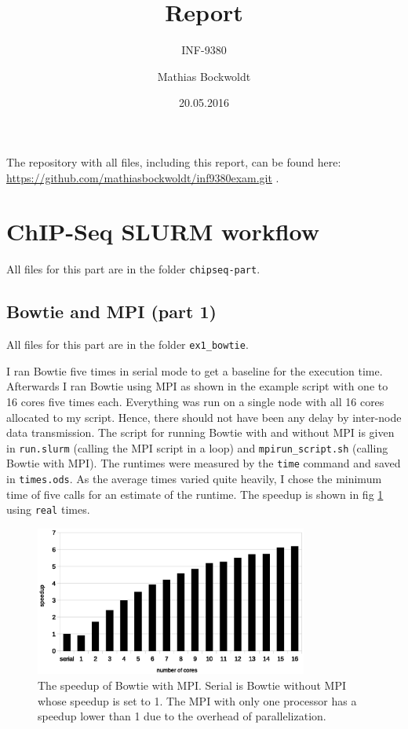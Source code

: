 \documentclass[paper=a4, 12pt]{scrartcl}
\begin{document}
\title{Report}
\subtitle{INF-9380}
\author{Mathias Bockwoldt}
\date{20.05.2016}

\maketitle

\onehalfspacing

The repository with all files, including this report, can be found here: \url{https://github.com/mathiasbockwoldt/inf9380exam.git} .

\section{ChIP-Seq SLURM workflow}

All files for this part are in the folder \texttt{chipseq-part}.

\subsection{Bowtie and MPI (part 1)}

All files for this part are in the folder \texttt{ex1\_bowtie}.

I ran Bowtie five times in serial mode to get a baseline for the execution time. Afterwards I ran Bowtie using MPI as shown in the example script with one to 16 cores five times each. Everything was run on a single node with all 16 cores allocated to my script. Hence, there should not have been any delay by inter-node data transmission. The script for running Bowtie with and without MPI is given in \texttt{run.slurm} (calling the MPI script in a loop) and \texttt{mpirun\_script.sh} (calling Bowtie with MPI). The runtimes were measured by the \texttt{time} command and saved in \texttt{times.ods}. As the average times varied quite heavily, I chose the minimum time of five calls for an estimate of the runtime. The speedup is shown in fig \ref{fig:chipseq-bowtie} using \texttt{real} times.

\begin{figure}[ht]
	\centering
		\includegraphics[width=0.8\textwidth]{chipseq-bowtie}
	\caption{The speedup of Bowtie with MPI. Serial is Bowtie without MPI whose speedup is set to 1. The MPI with only one processor has a speedup lower than 1 due to the overhead of parallelization.}
	\label{fig:chipseq-bowtie}
\end{figure}
\end{document}
